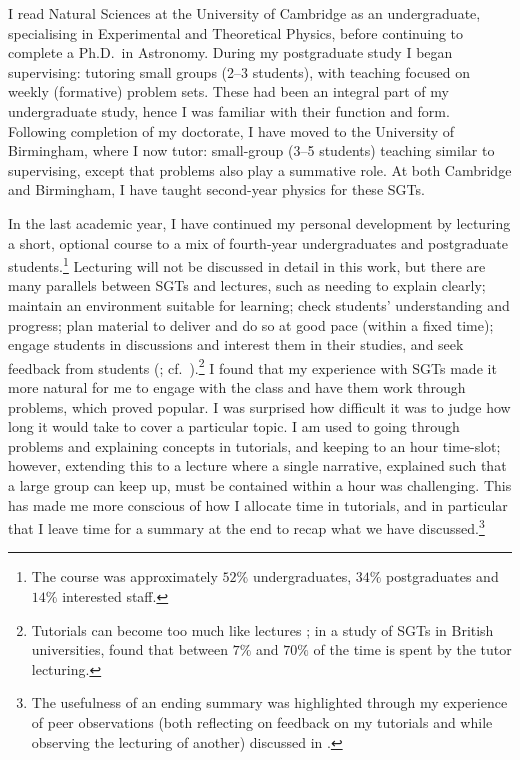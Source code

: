 I read Natural Sciences at the University of Cambridge as an undergraduate, specialising in Experimental and Theoretical Physics, before continuing to complete a Ph.D.\ in Astronomy. During my postgraduate study I began supervising: tutoring small groups (2--3 students), with teaching focused on weekly (formative) problem sets. These had been an integral part of my undergraduate study, hence I was familiar with their function and form. Following completion of my doctorate, I have moved to the University of Birmingham, where I now tutor: small-group (3--5 students) teaching similar to supervising, except that problems also play a summative role. At both Cambridge and Birmingham, I have taught second-year physics for these SGTs.

In the last academic year, I have continued my personal development by lecturing a short, optional course to a mix of fourth-year undergraduates and postgraduate students.\footnote{The course was approximately $52\%$ undergraduates, $34\%$ postgraduates and $14\%$ interested staff.} Lecturing will not be discussed in detail in this work, but there are many parallels between SGTs and lectures, such as needing to explain clearly; maintain an environment suitable for learning; check students' understanding and progress; plan material to deliver and do so at good pace (within a fixed time); engage students in discussions and interest them in their studies, and seek feedback from students (\citealt[chapter 3]{Brown1988}; cf.\ \citealt[chapter 6]{Ramsden1992}).\footnote{Tutorials can become too much like lectures \citep[chapter 9]{Ramsden1992}; in a study of SGTs in British universities, \citet[quoted in \citealt{Brown1988}, chapter 4]{Luker1987} found that between $7\%$ and $70\%$ of the time is spent by the tutor lecturing.} I found that my experience with SGTs made it more natural for me to engage with the class and have them work through problems, which proved popular. I was surprised how difficult it was to judge how long it would take to cover a particular topic. I am used to going through problems and explaining concepts in tutorials, and keeping to an hour time-slot; however, extending this to a lecture where a single narrative, explained such that a large group can keep up, must be contained within a hour was challenging. This has made me more conscious of how I allocate time in tutorials, and in particular that I leave time for a summary at the end to recap what we have discussed.\footnote{The usefulness of an ending summary was highlighted through my experience of peer observations (both reflecting on feedback on my tutorials and while observing the lecturing of another) discussed in .}

